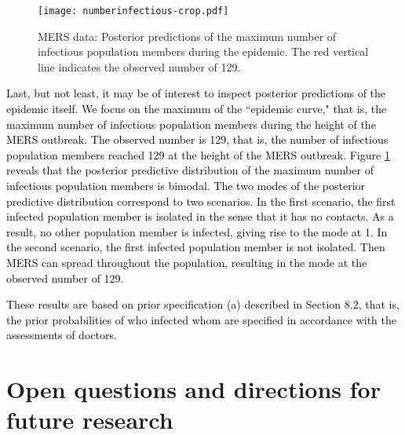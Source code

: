 \documentclass[12pt,usenatbib,referee]{article}
\renewcommand{\alert}{\textcolor{black}}
\begin{document}
\begin{figure}[htp]
\caption{\label{ppc.epidemic}
MERS data: Posterior predictions of the maximum number of infectious population members during the epidemic.
The red vertical line indicates the observed number of 129.
}
\s
\centering
\texttt{[image: numberinfectious-crop.pdf]}
\end{figure}

\alert{Last, 
but not least, 
it may be of interest to inspect posterior predictions of the epidemic itself.
We focus on the maximum of the ``epidemic curve,"
that is,
the maximum number of infectious population members during the height of the MERS outbreak.
The observed number is 129,
that is,
the number of infectious population members reached 129 at the height of the MERS outbreak.
Figure \ref{ppc.epidemic} reveals that the posterior predictive distribution of the maximum number of infectious population members is bimodal.
The two modes of the posterior predictive distribution correspond to two scenarios.
In the first scenario,
the first infected population member is isolated in the sense that it has no contacts.
As a result,
no other population member is infected,
giving rise to the mode at 1.
In the second scenario,
the first infected population member is not isolated.
Then MERS can spread throughout the population,
resulting in the mode at the observed number of 129.}

\alert{These results are based on prior specification (a) described in Section 8.2,
that is,
the prior probabilities of who infected whom are specified in accordance with the assessments of doctors.

}


\vspace{-.5cm}

\section{Open questions and directions for future research}
\label{discussion}
\end{document}
